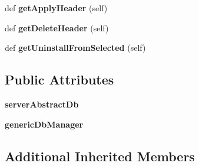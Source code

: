 \begin{DoxyCompactItemize}
def {\bfseries get\+Apply\+Header} (self)
\item 
\mbox{\label{class_dsg_tools_1_1_custom_widgets_1_1field_tool_box_config_manager_widget_1_1_field_tool_box_config_manager_widget_a33ef4eb9f3c874786921c17256a1654f}} 
def {\bfseries get\+Delete\+Header} (self)
\item 
\mbox{\label{class_dsg_tools_1_1_custom_widgets_1_1field_tool_box_config_manager_widget_1_1_field_tool_box_config_manager_widget_ac933883e098da37369289fdc3b71287f}} 
def {\bfseries get\+Uninstall\+From\+Selected} (self)
\end{DoxyCompactItemize}
\subsection*{Public Attributes}
\begin{DoxyCompactItemize}
\item 
\mbox{\label{class_dsg_tools_1_1_custom_widgets_1_1field_tool_box_config_manager_widget_1_1_field_tool_box_config_manager_widget_a00c558033644c2019299606245c7e998}} 
{\bfseries server\+Abstract\+Db}
\item 
\mbox{\label{class_dsg_tools_1_1_custom_widgets_1_1field_tool_box_config_manager_widget_1_1_field_tool_box_config_manager_widget_a915bc9acdb6e0d9cf0d1a333e046386b}} 
{\bfseries generic\+Db\+Manager}
\end{DoxyCompactItemize}
\subsection*{Additional Inherited Members}


